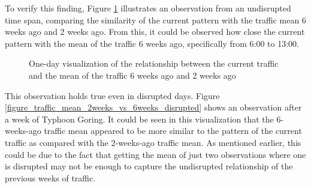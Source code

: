 
To verify this finding, Figure \ref{figure_traffic_mean_2weeks_vs_6weeks} illustrates an observation from an undisrupted time span, comparing the similarity of the current pattern with the traffic mean 6 weeks ago and 2 weeks ago. From this, it could be observed how close the current pattern with the mean of the traffic 6 weeks ago, specifically from 6:00 to 13:00.


\begin{figure}[h] 
\centering
  \caption{One-day visualization of the relationship between the current traffic and the mean of the traffic 6 weeks ago and 2 weeks ago}
  \label{figure_traffic_mean_2weeks_vs_6weeks}
\end{figure}



This observation holds true even in disrupted days. Figure \ref{figure_traffic_mean_2weeks_vs_6weeks_disrupted} shows an observation after a week of Typhoon Goring. It could be seen in this visualization that the 6-weeks-ago traffic mean appeared to be more similar to the pattern of the current traffic as compared with the 2-weeks-ago traffic mean. As mentioned earlier, this could be due to the fact that getting the mean of just two observations where one is disrupted may not be enough to capture the undisrupted relationship of the previous weeks of traffic.

